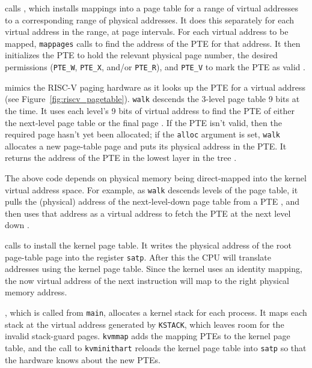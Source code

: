 calls
,
which
installs mappings into a page table
for a range of virtual addresses to
a corresponding range of physical addresses.
It does this separately for each virtual address in the range,
at page intervals.
For each virtual address to be mapped,
\lstinline{mappages}
calls
to find the address of the PTE for that address.
It then initializes the PTE to hold the relevant physical page
number, the desired permissions 
(\lstinline{PTE_W},
\lstinline{PTE_X},
and/or
\lstinline{PTE_R}),
and
\lstinline{PTE_V}
to mark the PTE as valid
.

mimics the RISC-V paging hardware as it
looks up the PTE for a virtual address (see
Figure~\ref{fig:riscv_pagetable}).
\lstinline{walk}
descends the 3-level page table 9 bits at the time.
It uses each level's 9 bits of virtual address to find
the PTE of either the next-level page table or the final page
.
If the PTE isn't valid, then
the required page hasn't yet been allocated;
if the
\lstinline{alloc}
argument is set,
\lstinline{walk}
allocates a new page-table page and puts its physical address in the PTE.
It returns the address of the PTE in the lowest layer in the tree
.

The above code depends on physical memory being direct-mapped into the
kernel virtual address space. For example, as \lstinline{walk} descends levels
of the page table, it pulls the (physical) address of the
next-level-down page table from a PTE ,
and then uses that address as a
virtual address to fetch the PTE at the next level down
.

calls
to install the kernel page table.
It writes the physical address of the root page-table page
into the register
\texttt{satp}.
After this the CPU will translate addresses using the kernel
page table.  Since the kernel uses an identity mapping, the now
virtual address of the next instruction will map to the right physical
memory address.

 , which is
called from \lstinline{main}, allocates a kernel stack for each
process. It maps each stack at the virtual address generated by
\lstinline{KSTACK}, which leaves room for the invalid stack-guard
pages. \lstinline{kvmmap} adds the mapping PTEs to the kernel page
table, and the call to \lstinline{kvminithart} reloads the kernel page
table into \texttt{satp} so that the hardware knows about the new
PTEs.

